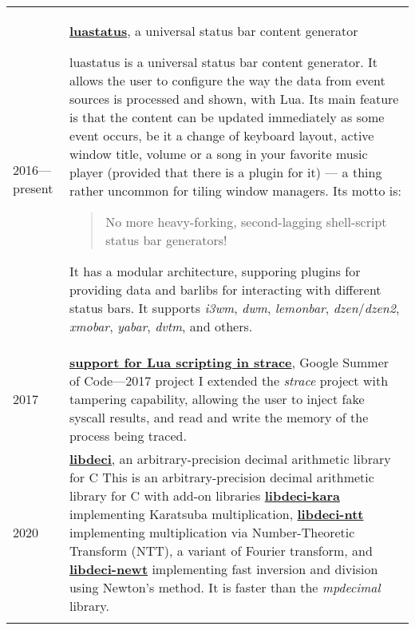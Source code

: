 \documentclass[10pt]{article}
\begin{document}
\begin{tabularx}{\textwidth}{ l X }

    2016---present & \href{https://github.com/shdown/luastatus}{\textbf{luastatus}}, a universal status bar content generator
    \newline
    \footnotesize{
        luastatus is a universal status bar content generator. It allows the user to configure the way the data from event sources is processed and shown, with Lua.
        Its main feature is that the content can be updated immediately as some event occurs, be it a change of keyboard layout, active window title, volume or a song in your favorite music player (provided that there is a plugin for it) — a thing rather uncommon for tiling window managers.
        Its motto is:
        \begin{quote}
        No more heavy-forking, second-lagging shell-script status bar generators!
        \end{quote}
        It has a modular architecture, supporing plugins for providing data and barlibs for interacting with different status bars.
        It supports \textit{i3wm}, \textit{dwm}, \textit{lemonbar}, \textit{dzen}/\textit{dzen2}, \textit{xmobar}, \textit{yabar}, \textit{dvtm}, and others.
    }
    \\
    \medskip

    2017 & \href{http://0x1.tv/img_auth.php/f/fe/Lua-\%D1\%81\%D0\%BA\%D1\%80\%D0\%B8\%D0\%BF\%D1\%82\%D0\%B8\%D0\%BD\%D0\%B3_\%D0\%B2_strace_\%28\%D0\%92\%D0\%B8\%D0\%BA\%D1\%82\%D0\%BE\%D1\%80_\%D0\%9A\%D1\%80\%D0\%B0\%D0\%BF\%D0\%B8\%D0\%B2\%D0\%B5\%D0\%BD\%D1\%81\%D0\%BA\%D0\%B8\%D0\%B9\%2C_OSSDEVCONF-2017\%29.pdf}{\textbf{support for Lua scripting in strace}}, Google Summer of Code---2017 project
    \newline
    \footnotesize{
        I extended the \textit{strace} project with tampering capability, allowing the user to inject fake syscall results, and read and write the memory of the process being traced.
    }
    \\
    \medskip

    2020 & \href{https://github.com/shdown/libdeci}{\textbf{libdeci}}, an arbitrary-precision decimal arithmetic library for C
    \newline
    \footnotesize{
        This is an arbitrary-precision decimal arithmetic library for C with add-on libraries
        \href{https://github.com/shdown/libdeci-kara}{\textbf{libdeci-kara}} implementing Karatsuba multiplication,
        \href{https://github.com/shdown/libdeci-ntt}{\textbf{libdeci-ntt}} implementing multiplication via Number-Theoretic Transform (NTT), a variant of Fourier transform,
        and \href{https://github.com/shdown/libdeci-newt}{\textbf{libdeci-newt}} implementing fast inversion and division using Newton's method.
        It is faster than the \textit{mpdecimal} library.
    }
    \\
    \medskip


\end{tabularx}
\end{document}
